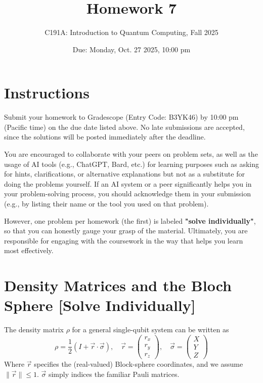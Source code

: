 \documentclass[11pt]{article}
\title{Homework 7}
\author{C191A: Introduction to Quantum Computing, Fall 2025}
\date{Due: Monday, Oct. 27 2025, 10:00 pm}
\begin{document}
\maketitle

\section*{Instructions}
Submit your homework to Gradescope (Entry Code: B3YK46) by 10:00 pm (Pacific time) on the due date listed above. No late submissions are accepted, since the solutions will be posted immediately after the deadline.

You are encouraged to collaborate with your peers on problem sets, as well as the usage of AI tools (e.g., ChatGPT, Bard, etc.) for learning purposes such as asking for hints, clarifications, or alternative explanations but not as a substitute for doing the problems yourself. If an AI system or a peer significantly helps you in your problem-solving process, you should acknowledge them in your submission (e.g., by listing their name or the tool you used on that problem).

However, one problem per homework (the first) is labeled \textbf{"solve individually"}, so that you can honestly gauge your grasp of the material. Ultimately, you are responsible for engaging with the coursework in the way that helps you learn most effectively.

\clearpage

\section{Density Matrices and the Bloch Sphere [Solve Individually]}

The density matrix $\rho$ for a general single-qubit system can be written as
\begin{equation*}
    \rho = \frac{1}{2}(I + \vec{r} \cdot \vec{\sigma}), \quad \vec{r} = \begin{pmatrix} r_x \\ r_y \\ r_z \end{pmatrix}, \quad \vec{\sigma} = \begin{pmatrix} X \\ Y \\ Z \end{pmatrix}
\end{equation*}
Where $\vec{r}$ specifies the (real-valued) Block-sphere coordinates, and we assume $\|\vec{r}\| \le 1$. $\vec{\sigma}$ simply indices the familiar Pauli matrices.
\end{document}
